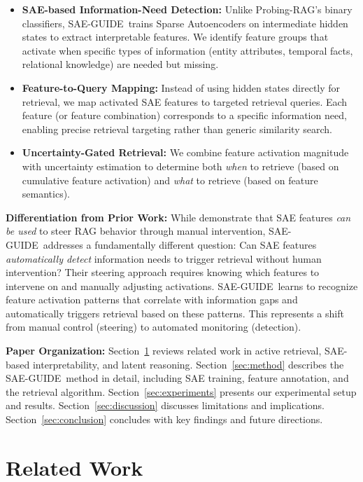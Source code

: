 \documentclass{article}
\newcommand{\ours}{SAE-GUIDE}
\begin{document}
\begin{itemize}
    \item \textbf{SAE-based Information-Need Detection:} Unlike Probing-RAG's binary classifiers, \ours\ trains Sparse Autoencoders on intermediate hidden states to extract interpretable features. We identify feature groups that activate when specific types of information (entity attributes, temporal facts, relational knowledge) are needed but missing.
    \item \textbf{Feature-to-Query Mapping:} Instead of using hidden states directly for retrieval, we map activated SAE features to targeted retrieval queries. Each feature (or feature combination) corresponds to a specific information need, enabling precise retrieval targeting rather than generic similarity search.
    \item \textbf{Uncertainty-Gated Retrieval:} We combine feature activation magnitude with uncertainty estimation to determine both \textit{when} to retrieve (based on cumulative feature activation) and \textit{what} to retrieve (based on feature semantics).
\end{itemize}

\textbf{Differentiation from Prior Work:} While \citet{xin-etal-2025-sparse} demonstrate that SAE features \textit{can be used} to steer RAG behavior through manual intervention, \ours\ addresses a fundamentally different question: Can SAE features \textit{automatically detect} information needs to trigger retrieval without human intervention? Their steering approach requires knowing which features to intervene on and manually adjusting activations. \ours\ learns to recognize feature activation patterns that correlate with information gaps and automatically triggers retrieval based on these patterns. This represents a shift from manual control (steering) to automated monitoring (detection).

\textbf{Paper Organization:} Section~\ref{sec:related} reviews related work in active retrieval, SAE-based interpretability, and latent reasoning. Section~\ref{sec:method} describes the \ours\ method in detail, including SAE training, feature annotation, and the retrieval algorithm. Section~\ref{sec:experiments} presents our experimental setup and results. Section~\ref{sec:discussion} discusses limitations and implications. Section~\ref{sec:conclusion} concludes with key findings and future directions.

\section{Related Work}
\label{sec:related}
\end{document}
